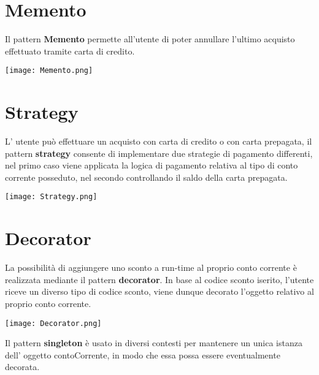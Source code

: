 \section{Memento}
Il pattern \textbf{Memento} permette all'utente di poter annullare l'ultimo acquisto effettuato tramite carta di credito. \\
\begin{center}
\texttt{[image: Memento.png]}
\end{center}

\section{Strategy}
L' utente pu\`{o} effettuare un acquisto con carta di credito o con carta prepagata, il pattern \textbf{strategy} consente di implementare due strategie di pagamento differenti, nel primo caso viene applicata la logica di pagamento relativa al tipo di conto corrente posseduto, nel secondo controllando il saldo della carta prepagata.\\
\begin{center}
\texttt{[image: Strategy.png]}
\end{center}
\newpage
\section{Decorator}
La possibilit\`{a} di aggiungere uno sconto a run-time al proprio conto corrente \`{e} realizzata mediante il pattern \textbf{decorator}. In base al codice sconto iserito, l'utente riceve un diverso tipo di codice sconto, viene dunque decorato l'oggetto relativo al proprio conto corrente.\\
\begin{center}
\texttt{[image: Decorator.png]}
\end{center}

Il pattern \textbf{singleton} \`{e} usato in diversi contesti per mantenere un unica istanza dell' oggetto contoCorrente, in modo che essa possa essere eventualmente decorata.\\

 